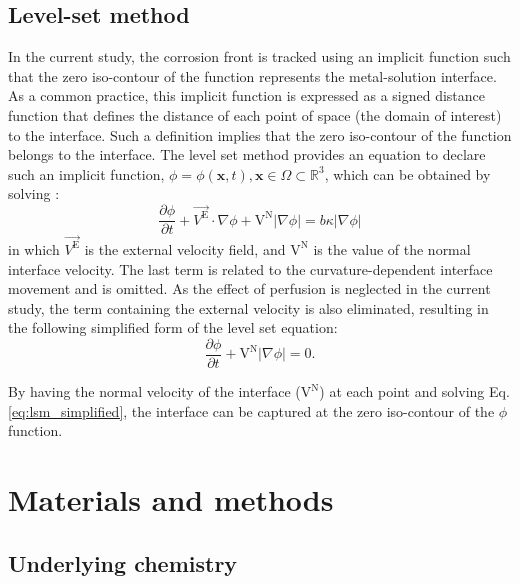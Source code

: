 \subsection{Level-set method}

In the current study, the corrosion front is tracked using an implicit function such that the zero iso-contour of the function represents the metal-solution interface. As a common practice, this implicit function is expressed as a signed distance function that defines the distance of each point of space (the domain of interest) to the interface. Such a definition implies that the zero iso-contour of the function belongs to the interface. The level set method provides an equation to declare such an implicit function, $\phi=\phi(\mathbf{x},t), \mathbf{x} \in \Omega \subset \mathbb{R}^{3}$, which can be obtained by solving \cite{RonaldFedkiw2002}:
\begin{equation} \label{eq:lsm_full}
\frac{\partial \phi}{\partial t}+{\overrightarrow{V^\mathrm{E}} \cdot \nabla \phi}+{\mathrm{V}^\mathrm{N}|\nabla \phi|}={b \kappa|\nabla \phi|}
\end{equation}
in which $\overrightarrow{V^\mathrm{E}}$ is the external velocity field, and  $\mathrm{V}^\mathrm{N}$ is the value of the normal interface velocity. The last term is related to the curvature-dependent interface movement and is omitted. As the effect of perfusion is neglected in the current study, the term containing the external velocity is also eliminated, resulting in the following simplified form of the level set equation:
\begin{equation} \label{eq:lsm_simplified}
\frac{\partial \phi}{\partial t}+\mathrm{V}^\mathrm{N}|\nabla \phi|=0.
\end{equation}

By having the normal velocity of the interface ($\mathrm{V}^\mathrm{N}$) at each point and solving Eq. \ref{eq:lsm_simplified}, the interface can be captured at the zero iso-contour of the $\phi$ function.

\section{Materials and methods}


\subsection{Underlying chemistry}

